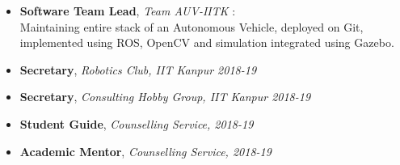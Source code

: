 
\begin{itemize}
\item \textbf{Software Team Lead}, \emph{Team AUV-IITK}
  : \\
  Maintaining entire stack of an Autonomous Vehicle, deployed on Git, implemented using ROS, OpenCV and simulation integrated using Gazebo.
\item \textbf{Secretary}, \emph{Robotics Club, IIT Kanpur 2018-19}
\item \textbf{Secretary}, \emph{Consulting Hobby Group, IIT Kanpur 2018-19}
\item \textbf{Student Guide}, \emph{Counselling Service, 2018-19}
\item \textbf{Academic Mentor}, \emph{Counselling Service, 2018-19}
\end{itemize}



